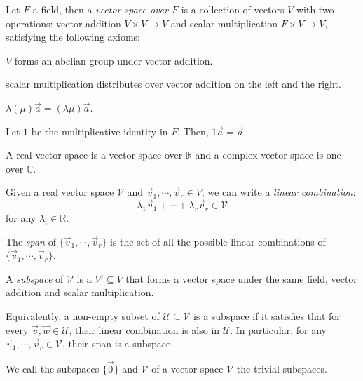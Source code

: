 \documentclass[12pt]{article}
\begin{document}
\begin{definition}
    Let $F$ a field, then
    a \emph{vector space over $F$} is a collection of vectors $V$
    with two operations: vector addition $V \times V \to V$ 
    and scalar multiplication $F \times V \to V$,
    satisfying the following axioms:
    \begin{compactenum}
    \item $V$ forms an abelian group under vector addition.
    \item scalar multiplication distributes over vector addition on the left and the right.
    \item $\lambda(\mu)\vec{a} = (\lambda\mu)\vec{a}$.
    \item Let $1$ be the multiplicative identity in $F$. Then, $1\vec{a} = \vec{a}$.
    \end{compactenum}
\end{definition}

A real vector space is a vector space over $\mathbb{R}$
and a complex vector space is one over $\mathbb{C}$.

\begin{definition}
    Given a real vector space $\mathcal{V}$ and 
    $\vec{v}_1,\cdots,\vec{v}_r \in V$,
    we can write a \emph{linear combination}:
    \[
    \lambda_1 \vec{v}_1 + \cdots + \lambda_r \vec{v}_r \in \mathcal{V}
    \]
    for any $\lambda_i \in \mathbb{R}$.
\end{definition}

\begin{definition}
    The \emph{span} of $\{\vec{v}_1,\cdots,\vec{v}_r\}$ is
    the set of all the possible linear combinations
    of $\{\vec{v}_1,\cdots,\vec{v}_r\}$.
\end{definition}

\begin{definition}
    A \emph{subspace} of $\mathcal{V}$ is a $V' \subseteq V$ that forms
    a vector space under the same field,
    vector addition and scalar multiplication.
\end{definition}

Equivalently, a non-empty subset of $\mathcal{U} \subseteq \mathcal{V}$
is a subspace if it satisfies that
for every $\vec{v},\vec{w} \in \mathcal{U}$, 
their linear combination is also in $\mathcal{U}$.
In particular, for any $\vec{v}_{1},\cdots,\vec{v}_r \in \mathcal{V}$,
their span is a subspace.

We call the subspaces $\{\vec{0}\}$ and $\mathcal{V}$ of a vector
space $\mathcal{V}$ the trivial subspaces.
\end{document}

